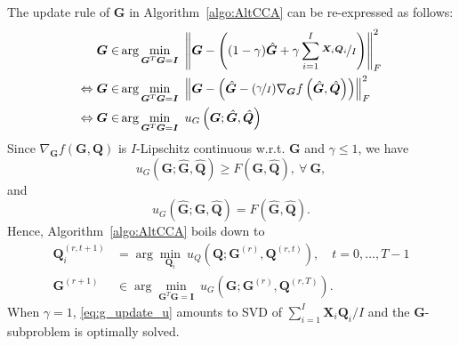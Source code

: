 \documentclass[10pt,journal]{IEEEtran}
\newcommand{\G}{\boldsymbol{G}}
\newcommand{\Q}{\boldsymbol{Q}}
\newcommand{\X}{\boldsymbol{X}}
\begin{document}
The update rule of $\G$ in Algorithm~\ref{algo:AltCCA} can be re-expressed as follows:
\begin{align*}
 \G \in & \arg\min_{\G^T\G={\bm I}}~\left\|\G - \left((1-\gamma)\hat{\G}+\gamma \sum_{i=1}^I\nicefrac{\X_i\Q_i}{I}\right)\right\|_F^2 \\
\Leftrightarrow  \G  \in & \arg\min_{\G^T\G={\bm I}}~\left\|\G - \left(\hat{\G}-(\nicefrac{\gamma}{I}) \nabla_{\G} f\left(\hat{\bm G},\hat{\bm Q}\right)\right)\right\|_F^2\\
\Leftrightarrow   \G  \in & \arg\min_{\G^T\G={\bm I}}~u_G\left(\G;\hat{\bm G},\hat{\bm Q}\right)
\end{align*}
Since $\nabla_{\G} f({\bm G},{\bm Q})$ is $I$-Lipschitz continuous w.r.t. $\G$ and $\gamma\leq 1$, we have
\begin{equation}\label{eq:ugleqf}
	u_G\left({\bm G};\hat{\bm G},\hat{\bm Q}\right)\geq F\left({\bm G},\hat{\bm Q}\right),~\forall~{\bm G},
\end{equation}
and
\begin{equation}\label{eq:ugeqf}
	u_G\left(\hat{\bm G};\hat{\bm G},\hat{\bm Q}\right)= F\left(\hat{\bm G},\hat{\bm Q}\right).
\end{equation}
Hence, Algorithm~\ref{algo:AltCCA} boils down to
\begin{subequations}
\begin{align}
{\bm Q}_i^{(r,t+1)}&= \arg\min_{{\bm Q}_i}~u_{Q}\left( {\bm Q};{\bm G}^{(r)},{\bm Q}^{(r,t)} \right),\quad t=0,\ldots, T-1 \label{eq:q_update_u}\\
\G^{(r+1)} &\in \arg\min_{\G^T\G={\bm I}}~u_G\left(\G;{\bm G}^{(r)},{\bm Q}^{(r,T)}\right). \label{eq:g_update_u}
\end{align}
\end{subequations}
When $\gamma=1$, \eqref{eq:g_update_u} amounts to SVD of $\sum_{i=1}^I\X_i\Q_i/I$ and the ${\bm G}$-subproblem is optimally solved.
\end{document}

